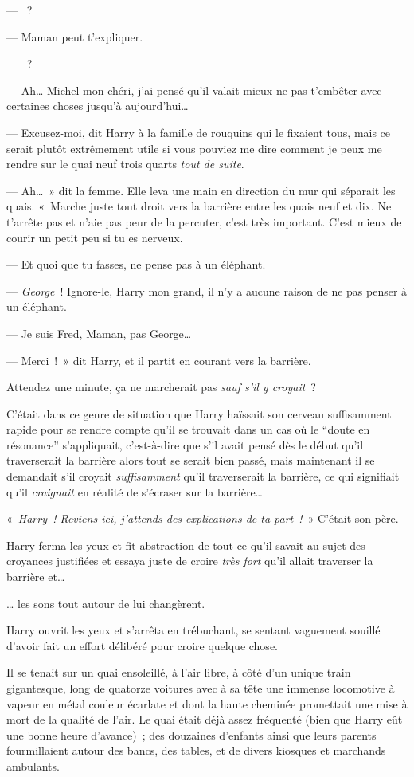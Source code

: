 --- ~?

--- Maman peut t'expliquer.

--- ~?

--- Ah… Michel mon chéri, j'ai pensé qu'il valait mieux ne pas t'embêter avec certaines choses jusqu'à aujourd'hui…

--- Excusez-moi, dit Harry à la famille de rouquins qui le fixaient tous, mais ce serait plutôt extrêmement utile si vous pouviez me dire comment je peux me rendre sur le quai neuf trois quarts \emph{tout de suite}.

--- Ah…~» dit la femme. Elle leva une main en direction du mur qui séparait les quais.
«~Marche juste tout droit vers la barrière entre les quais neuf et dix. Ne t'arrête pas et n'aie pas peur de la percuter, c'est très important. C'est mieux de courir un petit peu si tu es nerveux.

--- Et quoi que tu fasses, ne pense pas à un éléphant.

--- \emph{George}~! Ignore-le, Harry mon grand, il n'y a aucune raison de ne pas penser à un éléphant.

--- Je suis Fred, Maman, pas George…

--- Merci~!~» dit Harry, et il partit en courant vers la barrière.

Attendez une minute, ça ne marcherait pas \emph{sauf s'il y croyait}~?

C'était dans ce genre de situation que Harry haïssait son cerveau suffisamment rapide pour se rendre compte qu'il se trouvait dans un cas où le “doute en résonance” s'appliquait, c'est-à-dire que s'il avait pensé dès le début qu'il traverserait la barrière alors tout se serait bien passé, mais maintenant il se demandait s'il croyait \emph{suffisamment} qu'il traverserait la barrière, ce qui signifiait qu'il \emph{craignait} en réalité de s'écraser sur la barrière…

«~\emph{Harry~! Reviens ici, j'attends des explications de ta part~!}~» C'était son père.

Harry ferma les yeux et fit abstraction de tout ce qu'il savait au sujet des croyances justifiées et essaya juste de croire \emph{très fort} qu'il allait traverser la barrière et…

… les sons tout autour de lui changèrent.

Harry ouvrit les yeux et s'arrêta en trébuchant, se sentant vaguement souillé d'avoir fait un effort délibéré pour croire quelque chose.

Il se tenait sur un quai ensoleillé, à l'air libre, à côté d'un unique train gigantesque, long de quatorze voitures avec à sa tête une immense locomotive à vapeur en métal couleur écarlate et dont la haute cheminée promettait une mise à mort de la qualité de l'air.
Le quai était déjà assez fréquenté (bien que Harry eût une bonne heure d'avance)~; des douzaines d'enfants ainsi que leurs parents fourmillaient autour des bancs, des tables, et de divers kiosques et marchands ambulants.

